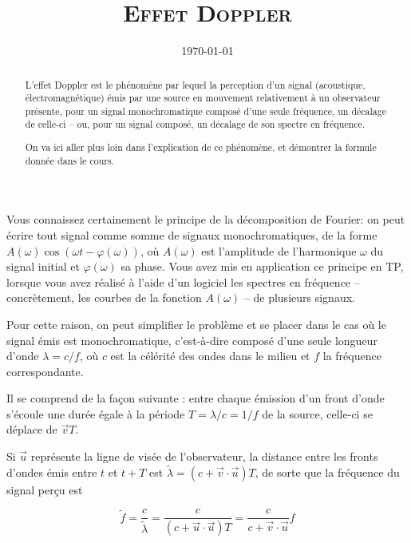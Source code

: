 \documentclass{article}
\title{\textsc{Effet Doppler}}
\author{}
\date{\today}
\renewcommand\phi\varphi
\begin{document}
\maketitle

\begin{abstract}
	L'effet Doppler est le phénomène par lequel la perception d'un signal (acoustique, électromagnétique) émis par une source en mouvement relativement à un observateur présente, pour un signal monochromatique composé d'une seule fréquence, un décalage de celle-ci -- ou, pour un signal composé, un décalage de son spectre en fréquence.
	
	On va ici aller plus loin dans l'explication de ce phénomène, et démontrer la formule donnée dans le cours.
\end{abstract}

Vous connaissez certainement le principe de la décomposition de Fourier: on peut écrire tout signal comme somme de signaux monochromatiques, de la forme $A(\omega)\cos(\omega t - \phi(\omega))$, où $A(\omega)$ est l'amplitude de l'harmonique $\omega$ du signal initial et $\phi(\omega)$ sa phase. Vous avez mis en application ce principe en TP, lorsque vous avez réalisé à l'aide d'un logiciel les spectres en fréquence -- concrètement, les courbes de la fonction $A(\omega)$ -- de plusieurs signaux.

Pour cette raison, on peut simplifier le problème et se placer dans le cas où le signal émis est monochromatique, c'est-à-dire composé d'une seule longueur d'onde $\lambda = c/f$, où $c$ est la célérité des ondes dans le milieu et $f$ la fréquence correspondante.


Il se comprend de la façon suivante : entre chaque émission d'un front d'onde s'écoule une durée égale à la période $T=\lambda/c=1/f$ de la source, celle-ci se déplace de $\vec v T$.

\begin{center}
\end{center}

Si $\vec u$ représente la ligne de visée de l'observateur, la distance entre les fronts d'ondes émis entre $t$ et $t+T$ est $\tilde{\lambda} = (c+\vec v\cdot\vec u)T$, de sorte que la fréquence du signal perçu est

\[
\tilde{f} = \frac{c}{\tilde{\lambda}} = \frac{c}{(c+\vec u \cdot \vec u)T} = \frac{c}{c+\vec v\cdot\vec u}f
\]
\end{document}
